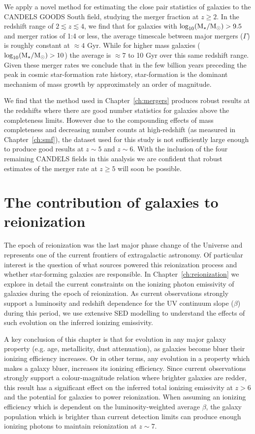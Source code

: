 We apply a novel method for estimating the close pair statistics of galaxies to the CANDELS GOODS South field, studying the merger fraction at $z\geq 2$. In the redshift range of $2 \lesssim z \lesssim 4$, we find that for galaxies with $\log_{10}(\text{M}_{\star}/\text{M}_{\odot}) > 9.5$ and merger ratios of 1:4 or less, the average timescale between major mergers ($\Gamma$) is roughly constant at $\approx 4$ Gyr. While for higher mass galaxies ($\log_{10}(\text{M}_{\star}/\text{M}_{\odot}) > 10$) the average is $\approx 7$ to 10 Gyr over this same redshift range. Given these merger rates we conclude that in the few billion years preceding the peak in cosmic star-formation rate history, star-formation is the dominant mechanism of mass growth by approximately an order of magnitude. 

We find that the method used in Chapter~\ref{ch:mergers} produces robust results at the redshifts where there are good number statistics for galaxies above the completeness limits. However due to the compounding effects of mass completeness and decreasing number counts at high-redshift (as measured in Chapter~\ref{ch:smf}), the dataset used for this study is not sufficiently large enough to produce good results at $z\sim5$ and $z\sim6$. With the inclusion of the four remaining CANDELS fields in this analysis we are confident that robust estimates of the merger rate at $z \geq 5$ will soon be possible.

\section{The contribution of galaxies to reionization}
The epoch of reionization was the last major phase change of the Universe and represents one of the current frontiers of extragalactic astronomy. Of particular interest is the question of what sources powered this reionization process and whether star-forming galaxies are responsible. In Chapter~\ref{ch:reionization} we explore in detail the current constraints on the ionizing photon emissivity of galaxies during the epoch of reionization. As current observations strongly support a luminosity and redshift dependence for the UV continuum slope ($\beta$) during this period, we use extensive SED modelling to understand the effects of such evolution on the inferred ionizing emissivity.

A key conclusion of this chapter is that for evolution in any major galaxy property (e.g. age, metallicity, dust attenuation), as galaxies become bluer their ionizing efficiency increases. Or in other terms, any evolution in a property which makes a galaxy bluer, increases its ionizing efficiency. Since current observations strongly support a colour-magnitude relation where brighter galaxies are redder, this result has a significant effect on the inferred total ionizing emissivity at $z > 6$ and the potential for galaxies to power reionization. When assuming an ionizing efficiency which is dependent on the luminosity-weighted average $\beta$, the galaxy population which is brighter than current detection limits can produce enough ionizing photons to maintain reionization at $z\sim7$. 

